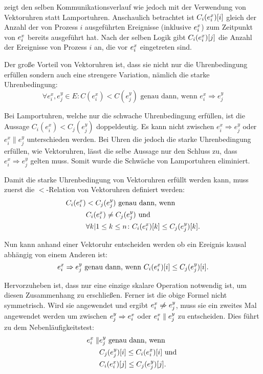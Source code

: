  zeigt den selben Kommunikationsverlauf wie  jedoch mit der Verwendung von Vektoruhren statt Lamportuhren.
Anschaulich betrachtet ist $C_i(e_i^x)[i]$ gleich der Anzahl der von Prozess $i$ ausgeführten Ereignisse (inklusive $e_i^x$) zum Zeitpunkt von $e_i^x$ bereits ausgeführt hat.
Nach der selben Logik gibt $C_i(e_i^x)[j]$ die Anzahl der Ereignisse von Prozess $i$ an, die vor $e_i^x$ eingetreten sind.

Der große Vorteil von Vektoruhren ist, dass sie nicht nur die Uhrenbedingung erfüllen sondern auch eine strengere Variation, nämlich die starke Uhrenbedingung:
\begin{equation*}
\forall e_i^x, e_j^y \in E \colon C(e_i^x) < C(e_j^y) \text{ genau dann, wenn } e_i^x \Rightarrow e_j^y
\end{equation*}

Bei Lamportuhren, welche nur die schwache Uhrenbedingung erfüllen, ist die Aussage $C_i(e_i^x)<C_j(e_j^y)$ doppeldeutig. 
Es kann nicht zwischen $e_i^x \Rightarrow e_j^y$ oder $e_i^x \parallel e_j^y$ unterschieden werden.
Bei Uhren die jedoch die starke Uhrenbedingung erfüllen, wie Vektoruhren, lässt die selbe Aussage nur den Schluss zu, dass $e_i^x \Rightarrow e_j^y$ gelten muss.
Somit wurde die Schwäche von Lamportuhren eliminiert.

Damit die starke Uhrenbedingung von Vektoruhren erfüllt werden kann, muss zuerst die $<$-Relation von Vektoruhren definiert werden:
\begin{align*}
C_i(e_i^x) &< C_j(e_j^y) \text{ genau dann, wenn} \\
       & C_i(e_i^x) \ne C_j(e_j^y) \text{ und } \\
       & \forall k | 1 \leq k \leq n \colon C_i(e_i^x)[k] \leq C_j(e_j^y)[k].
\end{align*}

Nun kann anhand einer Vektoruhr entscheiden werden ob ein Ereignis kausal abhängig von einem Anderen ist:
\begin{equation*}
    e_i^x \Rightarrow e_j^y \text{ genau dann, wenn } C_i(e_i^x)[i] \leq C_j(e_j^y)[i].
\end{equation*}

Hervorzuheben ist, dass nur eine einzige skalare Operation notwendig ist, um diesen Zusammenhang zu erschließen.
Ferner ist die obige Formel nicht symmetrisch.
Wird sie angewendet und ergibt $\eix \centernot\Rightarrow \ejy$, muss sie ein zweites Mal angewendet werden um zwischen $e_j^y \Rightarrow e_i^x$ oder $e_i^x \parallel e_j^y$ zu entscheiden.
Dies führt zu dem Nebenläufigkeitstest:
\begin{align*}
    e_i^x \parallel & e_j^y \text{ genau dann, wenn } \\
                   & C_j(e_j^y)[i] \le C_i(e_i^x)[i] \text{ und } \\
                   & C_i(e_i^x)[j] \le C_j(e_j^y)[j].
\end{align*}

